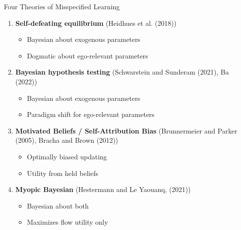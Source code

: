 \documentclass[aspectratio=169]{beamer}
\begin{document}
\begin{frame}{Four Theories of Misspecified Learning}
    
    \begin{enumerate}

        \item \textbf{Self-defeating equilibrium} (Heidhues et al. (2018)) \\
        \begin{itemize}
            \item Bayesian about exogenous parameters
            \item Dogmatic about ego-relevant parameters
        \end{itemize}
        \bigskip

        \item \textbf{Bayesian hypothesis testing} (Schwarstein and Sunderam (2021), Ba (2022))\\
        \begin{itemize}
            \item Bayesian about exogenous parameters 
            \item Paradigm shift for ego-relevant parameters
        \end{itemize}
        \bigskip

        \item \textbf{Motivated Beliefs / Self-Attribution Bias} (Brunnermeier and Parker (2005), Bracha and Brown (2012)) \\
        \begin{itemize}
            \item Optimally biased updating
            \item Utility from held beliefs 
        \end{itemize}
        \bigskip

        \item \textbf{Myopic Bayesian} (Hestermann and Le Yaouanq, (2021))\\
        \begin{itemize}
            \item Bayesian about both 
            \item Maximizes flow utility only
        \end{itemize}

    \end{enumerate}
    
\end{frame}
\end{document}
